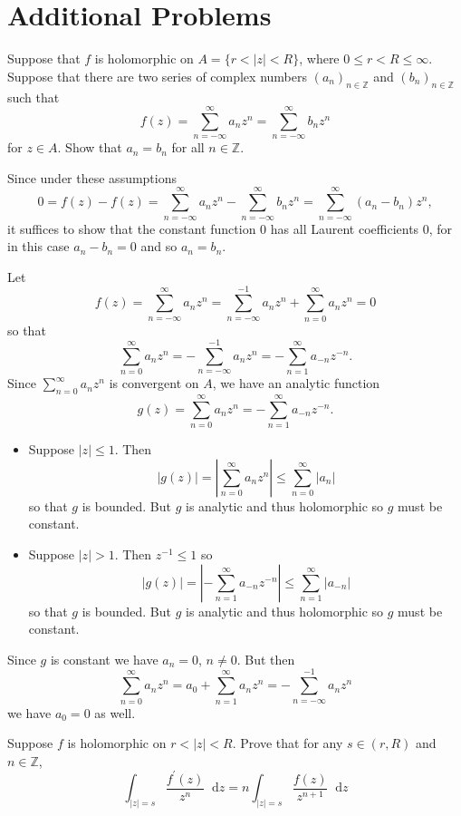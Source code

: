 \documentclass{article}
\newcommand\dif{\mathop{}\!\mathrm{d}}
\newcounter{Problem}
\newenvironment{Problem}{\begin{Exercise}[name={Problem},
                                          counter={Problem}]}
                        {\end{Exercise}}
\begin{document}
\section{Additional Problems}

\begin{Problem}
Suppose that $f$ is holomorphic on 
$A = \{ r < |z| < R \}$, where $0 \leq r < R \leq \infty$.
Suppose that there are two series of complex numbers 
$(a_n)_{n \in \mathbb{Z}}$ and $(b_n)_{n \in \mathbb{Z}}$ such that
$$
f(z) = \sum_{n=-\infty}^\infty a_n z^n = \sum_{n=-\infty}^\infty b_n z^n
$$
for $z \in A$. Show that $a_n = b_n$ for all $n \in \mathbb{Z}$.
\end{Problem}

\begin{Answer}
Since under these assumptions
$$
  0 
= f(z) - f(z) 
= \sum_{n=-\infty}^\infty a_n z^n - \sum_{n=-\infty}^\infty b_n z^n
= \sum_{n=-\infty}^\infty (a_n - b_n) z^n,
$$
it suffices to show that the constant function 0 has all
Laurent coefficients 0, for in this case $a_n - b_n = 0$ and
so $a_n = b_n$.

Let
$$
  f(z) 
= \sum_{n=-\infty}^\infty a_n z^n 
= \sum_{n=-\infty}^{-1} a_n z^n
+ \sum_{n=0}^\infty a_n z^n
= 0
$$
so that
$$
   \sum_{n=0}^\infty a_n z^n 
= -\sum_{n=-\infty}^{-1} a_n z^n
= -\sum_{n=1}^\infty a_{-n} z^{-n}.
$$
Since $\sum_{n=0}^\infty a_n z^n$ is convergent on $A$, we have an analytic
function
$$
g(z) = \sum_{n=0}^\infty a_n z^n = -\sum_{n=1}^\infty a_{-n} z^{-n}.
$$
\begin{itemize}
  \item{
    Suppose $|z| \leq 1$. Then
    $$
         |g(z)| 
    =    \left|\sum_{n=0}^\infty a_n z^n\right|
    \leq \sum_{n=0}^\infty |a_n|
    $$
    so that $g$ is bounded. But $g$ is analytic and thus holomorphic
    so $g$ must be constant.
  }
  \item{
    Suppose $|z| > 1$. Then $z^{-1} \leq 1$ so
    $$
         |g(z)|
    =    \left|-\sum_{n=1}^\infty a_{-n} z^{-n}\right|
    \leq \sum_{n=1}^\infty |a_{-n}|
    $$
    so that $g$ is bounded. But $g$ is analytic and thus holomorphic
    so $g$ must be constant.
  }
\end{itemize}
Since $g$ is constant we have $a_n = 0$, $n \neq 0$. But then
$$
  \sum_{n=0}^\infty a_n z^n 
= a_0 + \sum_{n=1}^\infty a_n z^n
= -\sum_{n=-\infty}^{-1} a_n z^n
$$
we have $a_0 = 0$ as well.
\end{Answer}

\begin{Problem}
Suppose $f$ is holomorphic on $r < |z| < R$. Prove that for any
$s \in (r, R)$ and $n \in \mathbb{Z}$,
$$
   \int_{|z| = s} \frac{f^\prime(z)}{z^n} \dif z
= n\int_{|z| = s} \frac{f(z)}{z^{n+1}} \dif z
$$
\end{Problem}
\end{document}
